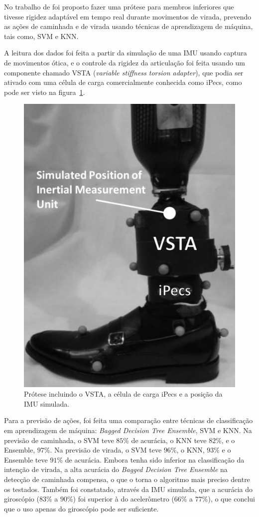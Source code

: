 No trabalho de  foi proposto fazer uma prótese para membros inferiores que tivesse rigidez adaptável em tempo real durante movimentos de virada, prevendo as ações de caminhada e de virada usando técnicas de aprendizagem de máquina, tais como, SVM e KNN. 

A leitura dos dados foi feita a partir da simulação de uma IMU usando captura de movimentos ótica, e o controle da rigidez da articulação foi feita usando um componente chamado VSTA (\textit{variable stiffness torsion adapter}), que podia ser ativado com uma célula de carga comercialmente conhecida como iPecs, como pode ser visto na figura~\ref{fig:rel_turnintent_1}.

\begin{figure}[ht]
	\caption{\label{fig:rel_turnintent_1}Prótese incluindo o VSTA, a célula de carga iPecs e a posição da IMU simulada.}
	\begin{center}
	    \includegraphics[width=.4\textwidth]{resources/rel_pew_turnintent_1}
	\end{center}
\end{figure}

Para a previsão de ações, foi feita uma comparação entre técnicas de classificação em aprendizagem de máquina: \textit{Bagged Decision Tree Ensemble}, SVM e KNN. Na previsão de caminhada, o SVM teve $85$\% de acurácia, o KNN teve $82$\%, e o Ensemble, $97$\%. Na previsão de virada, o SVM teve $96$\%, o KNN, $93$\% e o Ensemble teve $91$\% de acurácia. Embora tenha sido inferior na classificação da intenção de virada, a alta acurácia do \textit{Bagged Decision Tree Ensemble} na detecção de caminhada compensa, o que o torna o algoritmo mais preciso dentre os testados. Também foi constatado, através da IMU simulada, que a acurácia do giroscópio ($83$\% a $90$\%) foi superior à do acelerômetro ($66$\% a $77$\%), o que conclui que o uso apenas do giroscópio pode ser suficiente.

